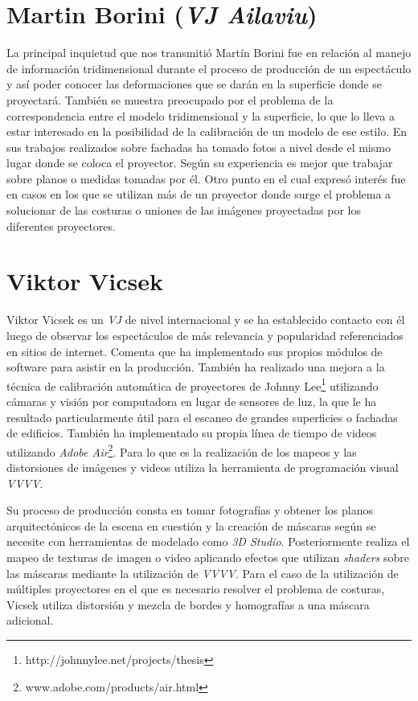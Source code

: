 \section{Martin Borini (\emph{VJ Ailaviu})}
La principal inquietud que nos transmitió Martín Borini \cite{Ailaviu} fue en relación al manejo de información tridimensional durante el proceso de producción de un espectáculo y así poder conocer las deformaciones que se darán en la superficie donde se proyectará. También se muestra preocupado por el problema de la correspondencia entre el modelo tridimensional y la superficie, lo que lo lleva a estar interesado en la posibilidad de la calibración de un modelo de ese estilo.
En sus trabajos realizados sobre fachadas ha tomado fotos a nivel desde el mismo lugar donde se coloca el proyector. Según su experiencia es mejor que trabajar sobre planos o medidas tomadas por él. Otro punto en el cual expresó interés fue en casos en los que se utilizan más de un proyector donde surge el problema a solucionar de las costuras o uniones de las imágenes proyectadas por los diferentes proyectores.

\section{Viktor Vicsek}
Viktor Vicsek \cite{Viktorvicsek} es un \emph{VJ} de nivel internacional y se ha establecido contacto con él luego de observar los espectáculos de más relevancia y popularidad referenciados en sitios de internet. Comenta que ha implementado sus propios módulos de software para asistir en la producción. También ha realizado una mejora a la técnica de calibración automática de proyectores de Johnny Lee\footnote{http://johnnylee.net/projects/thesis} utilizando cámaras y visión por computadora en lugar de sensores de luz, la que le ha resultado particularmente útil para el escaneo de grandes superficies o fachadas de edificios. También ha implementado su propia línea de tiempo de videos utilizando \emph{Adobe Air}\footnote{www.adobe.com/products/air.html}. Para lo que es la realización de los mapeos y las distorsiones de imágenes y videos utiliza la herramienta de programación visual \emph{VVVV}.

Su proceso de producción consta en tomar fotografías y obtener los planos arquitectónicos de la escena en cuestión y la creación de máscaras según se necesite con herramientas de modelado como \emph{3D Studio}. Posteriormente realiza el mapeo de texturas de imagen o video aplicando efectos que utilizan \emph{shaders} sobre las máscaras mediante la utilización de \emph{VVVV}. Para el caso de la utilización de múltiples proyectores en el que es necesario resolver el problema de costuras, Vicsek utiliza distorsión y mezcla de bordes y homografías a una máscara adicional.